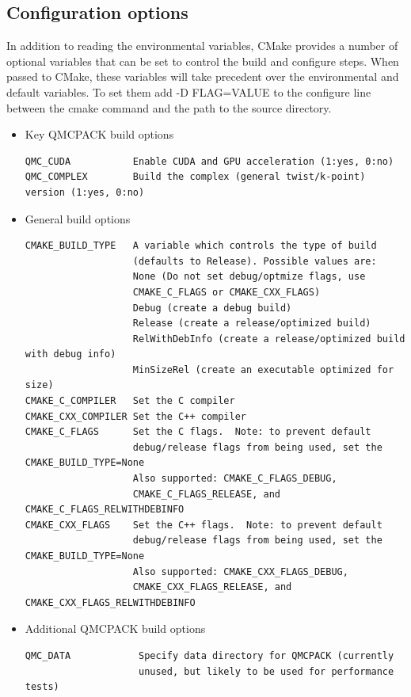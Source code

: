 \subsection{Configuration options}
\label{sec:cmakeoptions}
In addition to reading the environmental variables, CMake provides a
number of optional variables that can be set to control the build and
configure steps.  When passed to CMake, these variables will take
precedent over the environmental and default variables.  To set them
add -D FLAG=VALUE to the configure line between the cmake command and
the path to the source directory.

\begin{itemize}
\item  Key QMCPACK build options
\begin{verbatim}
QMC_CUDA           Enable CUDA and GPU acceleration (1:yes, 0:no)
QMC_COMPLEX        Build the complex (general twist/k-point) version (1:yes, 0:no)
\end{verbatim}
  \item General build options
\begin{verbatim}
CMAKE_BUILD_TYPE   A variable which controls the type of build
                   (defaults to Release). Possible values are:
                   None (Do not set debug/optmize flags, use 
                   CMAKE_C_FLAGS or CMAKE_CXX_FLAGS)
                   Debug (create a debug build)
                   Release (create a release/optimized build)
                   RelWithDebInfo (create a release/optimized build with debug info)
                   MinSizeRel (create an executable optimized for size)
CMAKE_C_COMPILER   Set the C compiler
CMAKE_CXX_COMPILER Set the C++ compiler
CMAKE_C_FLAGS      Set the C flags.  Note: to prevent default
                   debug/release flags from being used, set the CMAKE_BUILD_TYPE=None
                   Also supported: CMAKE_C_FLAGS_DEBUG,
                   CMAKE_C_FLAGS_RELEASE, and CMAKE_C_FLAGS_RELWITHDEBINFO
CMAKE_CXX_FLAGS    Set the C++ flags.  Note: to prevent default
                   debug/release flags from being used, set the CMAKE_BUILD_TYPE=None
                   Also supported: CMAKE_CXX_FLAGS_DEBUG,
                   CMAKE_CXX_FLAGS_RELEASE, and CMAKE_CXX_FLAGS_RELWITHDEBINFO
\end{verbatim}
\item Additional QMCPACK build options
\begin{verbatim}
QMC_DATA            Specify data directory for QMCPACK (currently
                    unused, but likely to be used for performance tests)

\end{verbatim}
\end{itemize}
